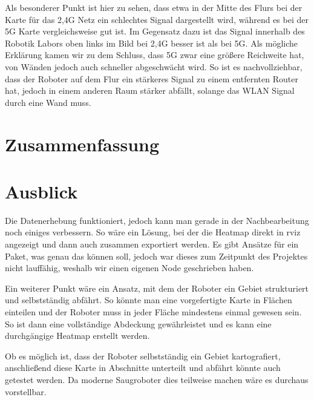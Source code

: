 \documentclass{scrartcl}%
\begin{document}
Als besonderer Punkt ist hier zu sehen, dass etwa in der Mitte des Flurs bei der Karte für das 2,4G Netz ein schlechtes Signal dargestellt wird, während es bei der 5G Karte vergleichsweise gut ist. Im Gegensatz dazu ist das Signal innerhalb des Robotik Labors oben links im Bild bei 2,4G besser ist als bei 5G. Als mögliche Erklärung kamen wir zu dem Schluss, dass 5G zwar eine größere Reichweite hat, von Wänden jedoch auch schneller abgeschwächt wird. So ist es nachvollziehbar, dass der Roboter auf dem Flur ein stärkeres Signal zu einem entfernten Router hat, jedoch in einem anderen Raum stärker abfällt, solange das WLAN Signal durch eine Wand muss.

\newpage
\section{Zusammenfassung}

\newpage
\section{Ausblick}
Die Datenerhebung funktioniert, jedoch kann man gerade in der Nachbearbeitung noch einiges verbessern. So wäre ein Lösung, bei der die Heatmap direkt in rviz angezeigt und dann auch zusammen exportiert werden. Es gibt Ansätze für ein Paket, was genau das können soll, jedoch war dieses zum Zeitpunkt des Projektes nicht lauffähig, weshalb wir einen eigenen Node geschrieben haben.

Ein weiterer Punkt wäre ein Ansatz, mit dem der Roboter ein Gebiet strukturiert und selbstständig abfährt. So könnte man eine vorgefertigte Karte in Flächen einteilen und der Roboter muss in jeder Fläche mindestens einmal gewesen sein. So ist dann eine vollständige Abdeckung gewährleistet und es kann eine durchgängige Heatmap erstellt werden.

Ob es möglich ist, dass der Roboter selbstständig ein Gebiet kartografiert, anschließend diese Karte in Abschnitte unterteilt und abfährt könnte auch getestet werden. Da moderne Saugroboter dies teilweise machen wäre es durchaus vorstellbar.

\newpage
\begin{flushleft}
	\printbibliography
\end{flushleft}
\end{document}
